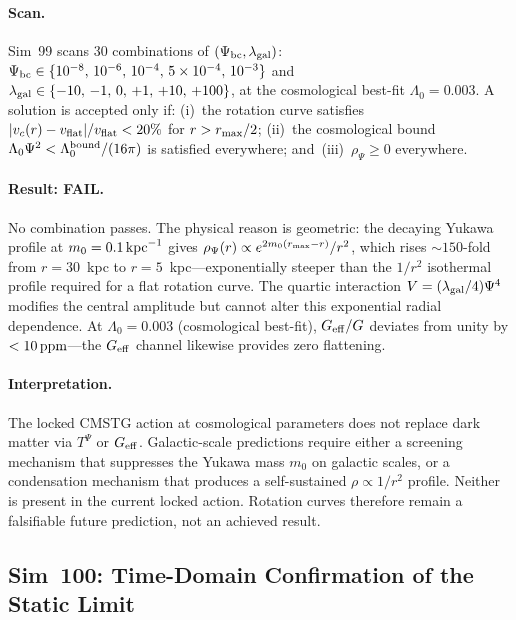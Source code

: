 \documentclass[12pt,a4paper]{article}
\begin{document}
\paragraph{Scan.}
Sim~99 scans 30 combinations of $(\Psi_{\rm bc}, \lambda_{\rm gal})$:
$\Psi_{\rm bc} \in \{10^{-8},\,10^{-6},\,10^{-4},\,5\times10^{-4},\,10^{-3}\}$
and $\lambda_{\rm gal} \in \{-10,\,-1,\,0,\,+1,\,+10,\,+100\}$, at the
cosmological best-fit $\Lambda_0 = 0.003$.  A solution is accepted only if:
(i)~the rotation curve satisfies $|v_c(r)-v_{\rm flat}|/v_{\rm flat} < 20\%$
for $r > r_{\rm max}/2$; (ii)~the cosmological bound
$\Lambda_0\Psi^2 < \Lambda_0^{\rm bound}/(16\pi)$ is satisfied everywhere;
and~(iii)~$\rho_\Psi \geq 0$ everywhere.

\paragraph{Result: FAIL.}
No combination passes.  The physical reason is geometric: the decaying
Yukawa profile at $m_0 = 0.1\,{\rm kpc}^{-1}$ gives
$\rho_\Psi(r) \propto e^{2m_0(r_{\rm max}-r)}/r^2$, which rises
$\sim 150$-fold from $r=30$~kpc to $r=5$~kpc---exponentially steeper
than the $1/r^2$ isothermal profile required for a flat rotation curve.
The quartic interaction $V = (\lambda_{\rm gal}/4)\Psi^4$ modifies the
central amplitude but cannot alter this exponential radial dependence.
At $\Lambda_0 = 0.003$ (cosmological best-fit), $G_{\rm eff}/G$ deviates
from unity by $< 10\,{\rm ppm}$---the $G_{\rm eff}$ channel likewise
provides zero flattening.

\paragraph{Interpretation.}
The locked CMSTG action at cosmological parameters does not replace dark
matter via $T^\Psi$ or $G_{\rm eff}$.  Galactic-scale predictions require
either a screening mechanism that suppresses the Yukawa mass $m_0$ on
galactic scales, or a condensation mechanism that produces a self-sustained
$\rho \propto 1/r^2$ profile.  Neither is present in the current locked
action.  Rotation curves therefore remain a falsifiable future prediction,
not an achieved result.

\subsection{Sim~100: Time-Domain Confirmation of the Static Limit}
\label{sec:sim100}
\end{document}
